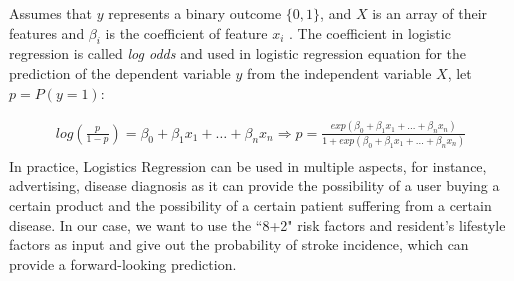 \documentclass{article}
\begin{document}
Assumes that $y$ represents a binary outcome $\{0, 1\}$, and $X$ is an array of their features and $\beta_i$ is the coefficient of feature $x_i$ \cite{peduzzi1996simulation}. The coefficient in logistic regression is called \textit{log odds} and used in logistic regression equation for the prediction of the dependent variable $y$ from the independent variable $X$, let $p = P(y=1)$:
\begin{comment}
\begin{align*}
    log\left(\frac{p(y = 1)}{1 - p(y = 1)}\right) &= \beta_0 + \beta_1 x_1 + \dots + \beta_n x_n \\
    \frac{p(y = 1)}{1 - p(y = 1)} &= exp(\beta_0 + \beta_1 x_1 + \dots + \beta_n x_n) \\
    \frac{1 - p(y = 1)}{p(y = 1)} &= \frac{1}{exp(\beta_0 + \beta_1 x_1 + \dots + \beta_n x_n)} \\
    \frac{1}{p(y = 1)} &= 1 + \frac{1}{exp(\beta_0 + \beta_1 x_1 + \dots + \beta_n x_n)} \\
    p(y=1) &= \frac{exp(\beta_0 + \beta_1 x_1 + \dots + \beta_n x_n)}{1 + exp(\beta_0 + \beta_1 x_1 + \dots + \beta_n x_n)} \\   
\end{align*}
\end{comment}
\begin{align*}
    log\left(\frac{p}{1 - p}\right) = \beta_0 + \beta_1 x_1 + \dots + \beta_n x_n \Rightarrow p = \frac{exp(\beta_0 + \beta_1 x_1 + \dots + \beta_n x_n)}{1 + exp(\beta_0 + \beta_1 x_1 + \dots + \beta_n x_n)} \\
\end{align*}
In practice, Logistics Regression can be used in multiple aspects, for instance, advertising, disease diagnosis as it can provide the possibility of a user buying a certain product and the possibility of a certain patient suffering from a certain disease. In our case, we want to use the ``8+2" risk factors and resident's lifestyle factors as input and give out the probability of stroke incidence, which can provide a forward-looking prediction.
\end{document}
